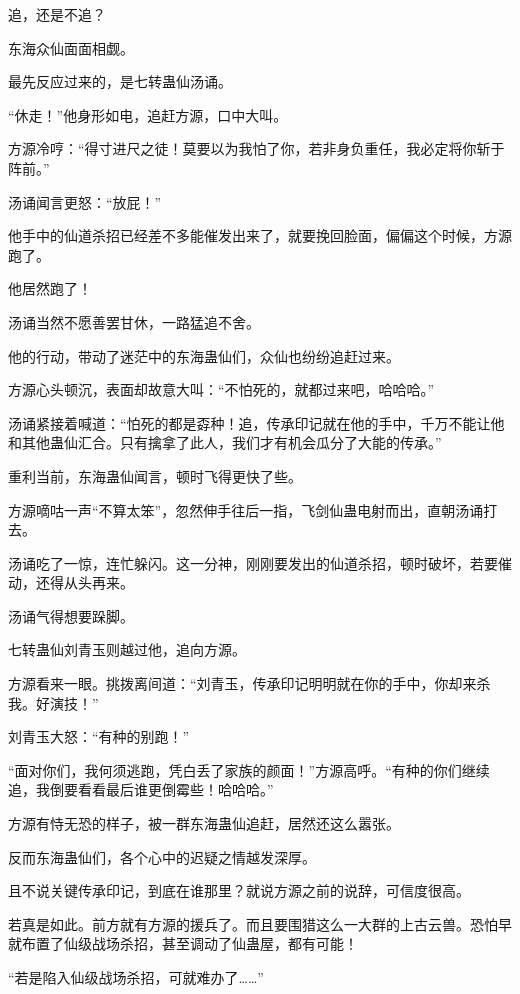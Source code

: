 
\begin{this_body}

追，还是不追？

东海众仙面面相觑。

最先反应过来的，是七转蛊仙汤诵。

“休走！”他身形如电，追赶方源，口中大叫。

方源冷哼：“得寸进尺之徒！莫要以为我怕了你，若非身负重任，我必定将你斩于阵前。”

汤诵闻言更怒：“放屁！”

他手中的仙道杀招已经差不多能催发出来了，就要挽回脸面，偏偏这个时候，方源跑了。

他居然跑了！

汤诵当然不愿善罢甘休，一路猛追不舍。

他的行动，带动了迷茫中的东海蛊仙们，众仙也纷纷追赶过来。

方源心头顿沉，表面却故意大叫：“不怕死的，就都过来吧，哈哈哈。”

汤诵紧接着喊道：“怕死的都是孬种！追，传承印记就在他的手中，千万不能让他和其他蛊仙汇合。只有擒拿了此人，我们才有机会瓜分了大能的传承。”

重利当前，东海蛊仙闻言，顿时飞得更快了些。

方源嘀咕一声“不算太笨”，忽然伸手往后一指，飞剑仙蛊电射而出，直朝汤诵打去。

汤诵吃了一惊，连忙躲闪。这一分神，刚刚要发出的仙道杀招，顿时破坏，若要催动，还得从头再来。

汤诵气得想要跺脚。

七转蛊仙刘青玉则越过他，追向方源。

方源看来一眼。挑拨离间道：“刘青玉，传承印记明明就在你的手中，你却来杀我。好演技！”

刘青玉大怒：“有种的别跑！”

“面对你们，我何须逃跑，凭白丢了家族的颜面！”方源高呼。“有种的你们继续追，我倒要看看最后谁更倒霉些！哈哈哈。”

方源有恃无恐的样子，被一群东海蛊仙追赶，居然还这么嚣张。

反而东海蛊仙们，各个心中的迟疑之情越发深厚。

且不说关键传承印记，到底在谁那里？就说方源之前的说辞，可信度很高。

若真是如此。前方就有方源的援兵了。而且要围猎这么一大群的上古云兽。恐怕早就布置了仙级战场杀招，甚至调动了仙蛊屋，都有可能！

“若是陷入仙级战场杀招，可就难办了……”


\end{this_body}
